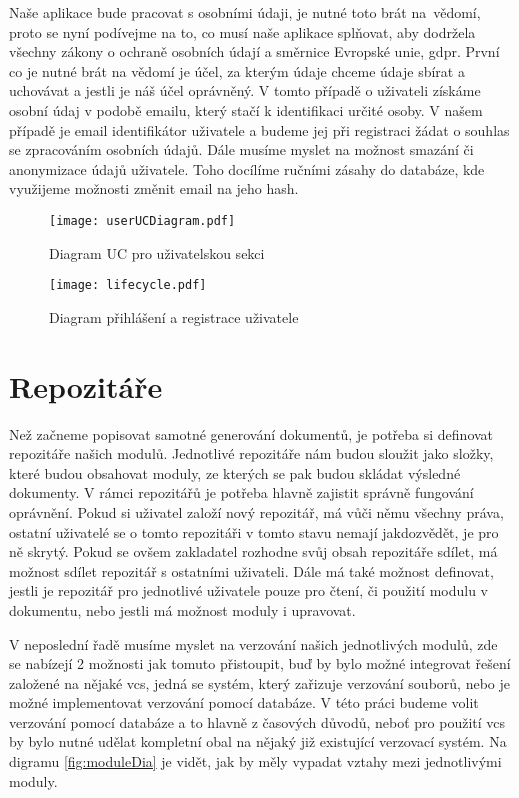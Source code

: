 Naše aplikace bude pracovat s osobními údaji, je nutné toto brát na~vědomí, proto se nyní podívejme na to, co musí naše aplikace splňovat, aby dodržela všechny
zákony o ochraně osobních údají a směrnice Evropské unie, \gls{gdpr}. První co je nutné brát na vědomí je účel, za kterým údaje chceme údaje sbírat a uchovávat a jestli je náš
účel oprávněný. V tomto případě o uživateli získáme osobní údaj v podobě emailu, který stačí k identifikaci určité osoby. V našem případě je email identifikátor uživatele
a budeme jej při registraci žádat o souhlas se zpracováním osobních údajů. Dále musíme myslet na možnost smazání či anonymizace údajů uživatele. Toho docílíme ručními
zásahy do databáze, kde využijeme možnosti změnit email na jeho hash. \cite{gdpr}

\begin{figure}[H]
    \centering
    \texttt{[image: userUCDiagram.pdf]}
    \caption{Diagram UC pro uživatelskou sekci}
    \label{fig:userUCDiagram}
\end{figure}

\begin{figure}[h]
    \centering
    \texttt{[image: lifecycle.pdf]}
    \caption{Diagram přihlášení a registrace uživatele}
    \label{fig:userFlow}
\end{figure}

\section{Repozitáře}

Než začneme popisovat samotné generování dokumentů, je potřeba si \mbox{definovat} repozitáře našich modulů. Jednotlivé repozitáře nám budou sloužit jako složky,
které budou obsahovat moduly, ze kterých se pak budou skládat výsledné dokumenty. V rámci repozitářů je potřeba hlavně zajistit správně fungování oprávnění.
Pokud si uživatel založí nový repozitář, má vůči němu všechny práva, ostatní uživatelé se o tomto repozitáři v tomto stavu nemají jak\linebreak dozvědět, je pro ně
skrytý. Pokud se ovšem zakladatel rozhodne svůj obsah repozitáře sdílet, má možnost sdílet repozitář s ostatními uživateli.
Dále má také možnost definovat, jestli je repozitář pro jednotlivé uživatele pouze pro čtení, či použití modulu v dokumentu,
nebo jestli má možnost moduly i upravovat.

V neposlední řadě musíme myslet na verzování našich jednotlivých modulů, zde se nabízejí 2 možnosti jak tomuto přistoupit, buď by bylo možné integrovat
řešení založené na nějaké \gls{vcs}, jedná se systém, který zařizuje verzování souborů,
nebo je možné implementovat verzování pomocí databáze. V této práci budeme volit verzování pomocí databáze a to hlavně z časových důvodů, neboť
pro použití vcs by bylo nutné udělat kompletní obal na nějaký již existující verzovací systém. Na digramu \ref{fig:moduleDia} je vidět, jak by měly
vypadat vztahy mezi jednotlivými moduly.

